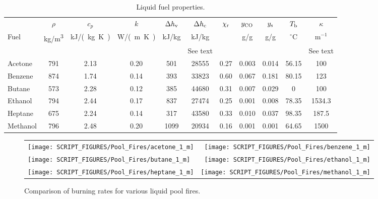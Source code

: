 \begin{table}[h!]
\begin{center}
\caption{Liquid fuel properties.} \label{fuelprops}
\begin{tabular}{|l|c|c|c|c|c|c|c|c|c|c|} \hline
        & $\rho$               & $c_p$                        & $k$                &  $\Delta h_{\rm v}$         &  $\Delta h_{\rm c}$  & $\chi_{\rm r}$       & $y_{\rm CO}$         & $y_{\rm s}$          & $T_{\rm b}$                    & $\kappa$  \\
Fuel    & \si{\kg/\m^3}        & \si{\kJ/(\kg.\K)}            & \si{\W/(\m.\K)}    & \si{\kJ/\kg}                & \si{\kJ/\kg}         &                      &  \si{\g/\g}          &  \si{\g/\g}          & $^\circ$C                      & m$^{-1}$  \\
        & \cite{Babrauskas:1}  & \cite{Webbook:HeatCapacity}  & \cite{CRCHandbook} &  \cite{Webbook:FluidThermo} & See text             & \cite{SFPE:Tewarson} & \cite{SFPE:Tewarson} & \cite{SFPE:Tewarson} & \cite{Webbook:BoilingPoint}    & See text  \\
\hline \hline
Acetone  &  791  &  2.13   & 0.20  &   501   & 28555  & 0.27 & 0.003 & 0.014 & 56.15 & 100    \\ \hline
Benzene  &  874  &  1.74   & 0.14  &   393   & 33823  & 0.60 & 0.067 & 0.181 & 80.15 & 123    \\ \hline
Butane   &  573  &  2.28   & 0.12  &   385   & 44680  & 0.31 & 0.007 & 0.029 & 0     & 100    \\ \hline
Ethanol  &  794  &  2.44   & 0.17  &   837   & 27474  & 0.25 & 0.001 & 0.008 & 78.35 & 1534.3 \\ \hline
Heptane  &  675  &  2.24   & 0.14  &   317   & 43580  & 0.33 & 0.010 & 0.037 & 98.35 & 187.5  \\ \hline
Methanol &  796  &  2.48   & 0.20  &   1099  & 20934  & 0.16 & 0.001 & 0.001 & 64.65 & 1500   \\ \hline
\end{tabular}
\end{center}
\end{table}

\newpage

\begin{figure}[p]
\begin{tabular*}{\textwidth}{l@{\extracolsep{\fill}}r}
\texttt{[image: SCRIPT\_FIGURES/Pool\_Fires/acetone\_1\_m]} &
\texttt{[image: SCRIPT\_FIGURES/Pool\_Fires/benzene\_1\_m]} \\
\texttt{[image: SCRIPT\_FIGURES/Pool\_Fires/butane\_1\_m]} &
\texttt{[image: SCRIPT\_FIGURES/Pool\_Fires/ethanol\_1\_m]} \\
\texttt{[image: SCRIPT\_FIGURES/Pool\_Fires/heptane\_1\_m]} &
\texttt{[image: SCRIPT\_FIGURES/Pool\_Fires/methanol\_1\_m]} \\
\end{tabular*}
\caption[Comparison of burning rates for various liquid pool fires.]{Comparison of burning rates for various liquid pool fires.}
\label{POOL_MLR}
\end{figure}

